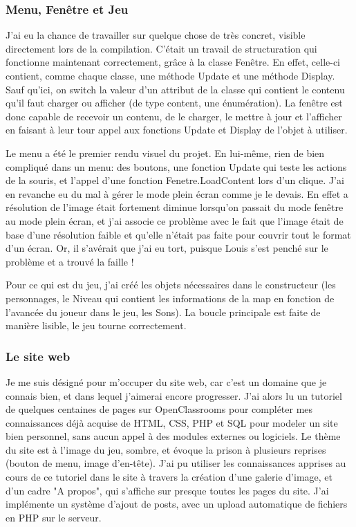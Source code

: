 \documentclass{article}
\begin{document}
\subsubsection {Menu, Fenêtre et Jeu}

\par
J'ai eu la chance de travailler sur quelque chose de très concret, visible directement lors de la compilation. C'était un travail de structuration qui fonctionne maintenant correctement, grâce à la classe Fenêtre. En effet, celle-ci contient, comme chaque classe, une méthode Update et une méthode Display. Sauf qu'ici, on switch la valeur d'un attribut de la classe qui contient le contenu qu'il faut charger ou afficher (de type content, une énumération). La fenêtre est donc capable de recevoir un contenu, de le charger, le mettre à jour et l'afficher en faisant à leur tour appel aux fonctions Update et Display de l'objet à utiliser.

\par
Le menu a été le premier rendu visuel du projet. En lui-même, rien de bien compliqué dans un menu: des boutons, une fonction Update qui teste les actions de la souris, et l'appel d'une fonction Fenetre.LoadContent lors d'un clique. J'ai en revanche eu du mal à gérer le mode plein écran comme je le devais. En effet a résolution de l'image était fortement diminue lorsqu'on passait du mode fenêtre au mode plein écran, et j'ai associe ce problème avec le fait que l'image était de base d'une résolution faible et qu'elle n'était pas faite pour couvrir tout le format d'un écran. Or, il s'avérait que j'ai eu tort, puisque Louis s'est penché sur le problème et a trouvé la faille ! 

\par
Pour ce qui est du jeu, j'ai créé les objets nécessaires dans le constructeur (les personnages, le Niveau qui contient les informations de la map en fonction de l'avancée du joueur dans le jeu, les Sons). La boucle principale est faite de manière lisible, le jeu tourne correctement.

\subsubsection{Le site web}
Je me suis désigné pour m'occuper du site web, car c'est un domaine que je connais bien, et dans lequel j'aimerai encore progresser. J'ai alors lu un tutoriel de quelques centaines de pages sur OpenClassrooms pour compléter mes connaissances déjà acquise de HTML, CSS, PHP et SQL pour modeler un site bien personnel, sans aucun appel à des modules externes ou logiciels. Le thème du site est à l'image du jeu, sombre, et évoque la prison à plusieurs reprises (bouton de menu, image d'en-tête). J'ai pu utiliser les connaissances apprises au cours de ce tutoriel dans le site à travers la création d'une galerie d'image, et d'un cadre "A propos", qui s'affiche sur presque toutes les pages du site. J'ai implémente un système d'ajout de posts, avec un upload automatique de fichiers en PHP sur le serveur.
\end{document}
